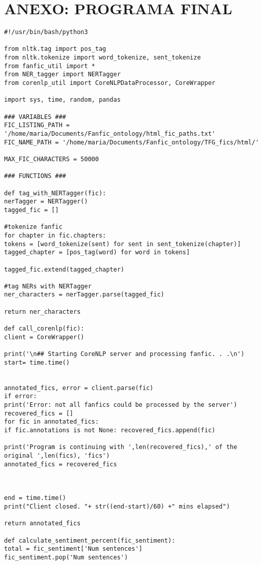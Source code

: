 \documentclass{pre-tfg}
\begin{document}
\cleardoublepage
\section{ANEXO: PROGRAMA FINAL}
\begin{lstlisting}[style=consola]
#!/usr/bin/bash/python3

from nltk.tag import pos_tag
from nltk.tokenize import word_tokenize, sent_tokenize
from fanfic_util import *
from NER_tagger import NERTagger
from corenlp_util import CoreNLPDataProcessor, CoreWrapper

import sys, time, random, pandas

### VARIABLES ###
FIC_LISTING_PATH = '/home/maria/Documents/Fanfic_ontology/html_fic_paths.txt'
FIC_NAME_PATH = '/home/maria/Documents/Fanfic_ontology/TFG_fics/html/'

MAX_FIC_CHARACTERS = 50000

### FUNCTIONS ###

def tag_with_NERTagger(fic):
nerTagger = NERTagger()
tagged_fic = []

#tokenize fanfic
for chapter in fic.chapters:
tokens = [word_tokenize(sent) for sent in sent_tokenize(chapter)]
tagged_chapter = [pos_tag(word) for word in tokens]

tagged_fic.extend(tagged_chapter)

#tag NERs with NERTagger
ner_characters = nerTagger.parse(tagged_fic)

return ner_characters

def call_corenlp(fic):
client = CoreWrapper()

print('\n## Starting CoreNLP server and processing fanfic. . .\n')
start= time.time()


annotated_fics, error = client.parse(fic)
if error:
print('Error: not all fanfics could be processed by the server')
recovered_fics = []
for fic in annotated_fics:
if fic.annotations is not None: recovered_fics.append(fic)

print('Program is continuing with ',len(recovered_fics),' of the original ',len(fics), 'fics')
annotated_fics = recovered_fics



end = time.time()
print("Client closed. "+ str((end-start)/60) +" mins elapsed")

return annotated_fics

def calculate_sentiment_percent(fic_sentiment):
total = fic_sentiment['Num sentences']
fic_sentiment.pop('Num sentences')


\end{lstlisting}
\end{document}
